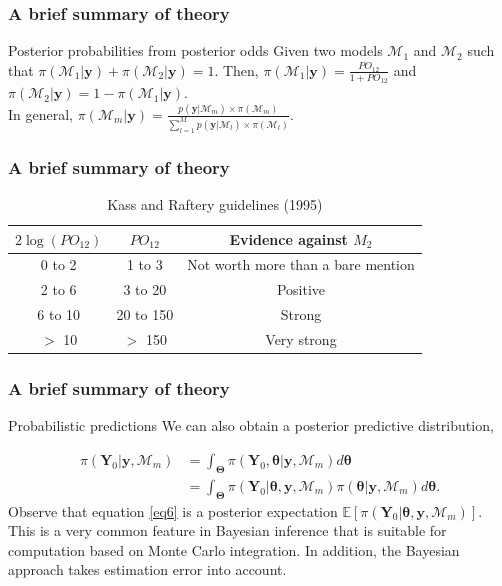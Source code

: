 \documentclass[12pt, compress]{beamer}
\begin{document}
\begin{frame}
	\frametitle{A brief summary of theory}
	
	\begin{block}{Posterior probabilities from posterior odds}
	Given two models $\mathcal{M}_1$ and $\mathcal{M}_2$ such that $\pi(\mathcal{M}_1|\boldsymbol{y})+\pi(\mathcal{M}_2|\boldsymbol{y})=1$. Then, $\pi(\mathcal{M}_1|\boldsymbol{y})=\frac{PO_{12}}{1+PO_{12}}$ and $\pi(\mathcal{M}_2|\boldsymbol{y})=1-\pi(\mathcal{M}_1|\boldsymbol{y})$.\\ 
	
	In general, $\pi(\mathcal{M}_m|\boldsymbol{y})=\frac{p(\boldsymbol{y}|\mathcal{M}_m)\times \pi(\mathcal{M}_m)}{\sum_{l=1}^M p(\boldsymbol{y}|\mathcal{M}_l)\times \pi(\mathcal{M}_l)}$.
	\end{block}	
\end{frame}

\begin{frame}
	\frametitle{A brief summary of theory}

\begin{table}
\begin{center}
	\begin{tabular}{ c| c| c }
		$2\log(PO_{12})$ & $PO_{12}$ & Evidence against $M_2$ \\
		\hline
		0 to 2 &	1 to 3 & Not worth more than a bare mention\\
		2 to 6 &	3 to 20	& Positive\\
		6 to 10 &	20 to 150 &	Strong\\
		$>$ 10 &	$>$ 150 &	Very strong\\
		\hline
		\end{tabular}
	\caption{Kass and Raftery guidelines (1995)}
	\label{tab1}
\end{center}
\end{table}
\end{frame}

\begin{frame}
	\frametitle{A brief summary of theory}
	
	\begin{block}{Probabilistic predictions}
		We can also obtain a posterior predictive distribution,
	\end{block}	
\begin{align}\label{eq6}
\pi(\boldsymbol{Y}_0|\boldsymbol{y},\mathcal{M}_m) & =\int_{\boldsymbol{\Theta}}\pi(\boldsymbol{Y}_0,\boldsymbol{\theta}|\boldsymbol{y},\mathcal{M}_m)d\boldsymbol{\theta}\nonumber\\
&=\int_{\boldsymbol{\Theta}}\pi(\boldsymbol{Y}_0|\boldsymbol{\theta},\boldsymbol{y},\mathcal{M}_m)\pi(\boldsymbol{\theta}|\boldsymbol{y},\mathcal{M}_m)d\boldsymbol{\theta}.
\end{align}
Observe that equation \ref{eq6} is a posterior expectation $\mathbb{E}[\pi(\boldsymbol{Y}_0|\boldsymbol{\theta},\boldsymbol{y},\mathcal{M}_m)]$. This is a very common feature in Bayesian inference that is suitable for computation based on Monte Carlo integration. In addition, the Bayesian approach takes estimation error into account.

\end{frame}
\end{document}
